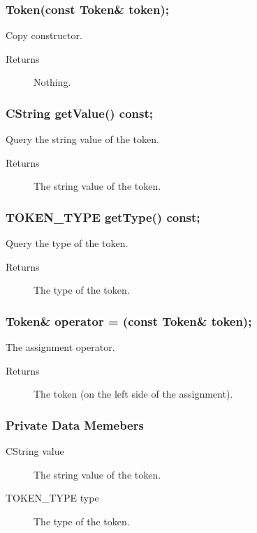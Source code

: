 \subsubsection{Token(const Token\& token);}
Copy constructor.
\begin{description}
  \item [Returns] Nothing.
\end{description}

\subsubsection{CString getValue() const;}
Query the string value of the token.
\begin{description}
  \item [Returns] The string value of the token.
\end{description}

\subsubsection{TOKEN\_TYPE getType() const;}
Query the type of the token.
\begin{description}
  \item [Returns] The type of the token.
\end{description}

\subsubsection{Token\& operator = (const Token\& token);}
The assignment operator.
\begin{description}
  \item [Returns] The token (on the left side of the assignment).
\end{description}

\subsubsection{Private Data Memebers}
\begin{description}
  \item [CString value] The string value of the token.
  \item [TOKEN\_TYPE type]  The type of the token.
\end{description}
